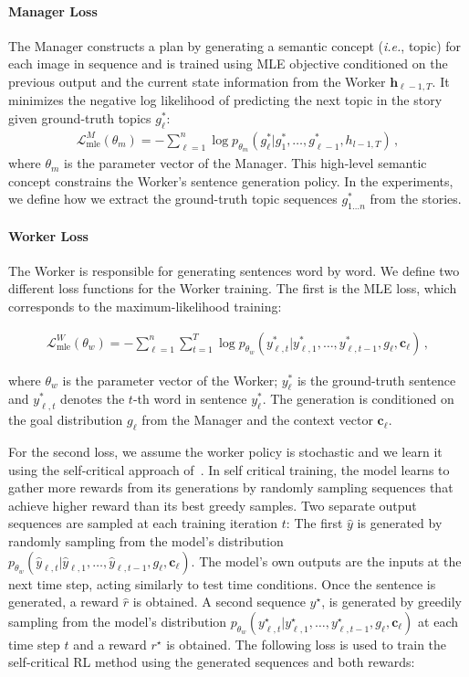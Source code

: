 \documentclass[letterpaper]{article} \usepackage{aaai19}  \usepackage{times}  \usepackage{helvet}  \usepackage{courier}  \usepackage{url}  \usepackage{graphicx}
\newcommand{\cv}{{\boldsymbol c}}
\newcommand{\hv}{{\boldsymbol h}}
\newcommand{\Lcal}{\mathcal{L}}
\begin{document}
\paragraph{Manager Loss}
The Manager constructs a plan by generating a semantic concept (\emph{i.e.}, topic) for each image in sequence and is trained using MLE objective conditioned on the previous output and the current state information from the Worker $\hv_{\ell-1,T}$. It minimizes the negative log likelihood of predicting the next topic in the story given ground-truth topics $g_{\ell}^*$:
\begin{align}
	\Lcal_{\textrm{mle}}^M (\theta_m) = -\sum_{\ell=1}^{n} \log p_{\theta_m}(g_{\ell}^*|g_{1}^*,\ldots,g_{\ell-1}^*, h_{l-1,T}) \,,
	\label{managerpolicylearning}
\end{align}
where $\theta_m$ is the parameter vector of the Manager. This high-level semantic concept constrains the Worker's sentence generation policy. In the experiments, we define how we extract the ground-truth topic sequences $g_{1\dots n}^*$ from the stories. 
\paragraph{Worker Loss}
The Worker is responsible for generating sentences word by word. We define two different loss functions for the Worker training. The first is the MLE loss, which corresponds to the maximum-likelihood training: 
\begin{adjustbox}{minipage=1.10\linewidth,scale=0.91}
	\begin{align}
		\Lcal_{\textrm{mle}}^W (\theta_w)= -\sum_{\ell=1}^n \sum_{t=1}^{T} \log p_{\theta_w}(y_{\ell,t}^*|y_{\ell,1}^*,\ldots,y_{\ell,t-1}^*,g_{\ell},\cv_{\ell})\,,
		\label{eqn:mle_loss}
	\end{align} 
\end{adjustbox}
where $\theta_w$ is the parameter vector of the Worker; $y_{\ell}^*$ is the ground-truth sentence and $y_{\ell,t}^*$ denotes the $t$-th word in sentence $y_{\ell}^*$. The generation is conditioned on the goal distribution $g_{\ell}$ from the Manager and the context vector $\cv_{\ell}$.  

For the second loss, we assume the worker policy is stochastic and we learn it using the self-critical approach of~\cite{Rennie2016Self}. 
In self critical training, the model learns to gather more rewards from its generations by randomly sampling sequences that achieve higher reward than its best greedy samples. Two separate output sequences are sampled at each training iteration $t$: The first $\hat{y}$ is generated by randomly sampling from the model's distribution $p_{\theta_w}(\hat{y}_{\ell,t}|\hat{y}_{\ell,1},\ldots,\hat{y}_{\ell,t-1},g_{\ell},\cv_{\ell})$. The model's own outputs are the inputs at the next time step, acting similarly to test time conditions. Once the sentence is generated, a reward $\hat{r}$ is obtained. A second sequence $y^{\star}$, is generated by greedily sampling from the model's distribution $p_{\theta_w}(y^{\star}_{\ell,t}|y^{\star}_{\ell,1},\ldots,y^{\star}_{\ell,t-1},g_{\ell},\cv_{\ell})$ at each time step $t$ and a reward $r^{\star}$ is obtained. The following loss is used to train the self-critical RL method using the generated sequences and both rewards:
\end{document}
